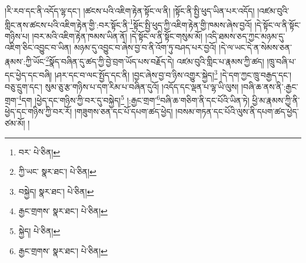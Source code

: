 །རི་རབ་དང་ནི་འདོད་ལྷ་དང་། །ཚངས་པའི་འཇིག་རྟེན་སྟོང་ལ་ནི། །སྟོང་ནི་སྤྱི་ཕུད་ཡིན་པར་འདོད། །འཛམ་བུའི་གླིང་ནས་ཚངས་པའི་འཇིག་རྟེན་གྱི་:བར་སྟོང་ནི་\footnote{བར་  པེ་ཅིན། }སྟོང་སྤྱི་ཕུད་ཀྱི་འཇིག་རྟེན་གྱི་ཁམས་ཞེས་བྱའོ། །དེ་སྟོང་ལ་ནི་སྟོང་གཉིས་པ། །བར་མའི་འཇིག་རྟེན་ཁམས་ཡིན་ནོ། །དེ་སྟོང་ལ་ནི་སྟོང་གསུམ་མོ། །འདི་ཐམས་ཅད་ཀྱང་མཉམ་དུ་འཇིག་ཅིང་འབྱུང་བ་ཡིན། མཉམ་དུ་འབྱུང་བ་ཞེས་བྱ་བ་ནི་འོག་ཏུ་བཤད་པར་བྱའོ། །དེ་ལ་ཡང་དེ་ན་སེམས་ཅན་རྣམས་:ཀྱི་ཡོང་\footnote{ཀྱི་ཡང་  སྣར་ཐང་།  པེ་ཅིན། }སྣོད་བཞིན་དུ་ཚད་ཀྱི་བྱེ་བྲག་ཡོད་པས་བརྗོད་དེ། འཛམ་བུའི་གླིང་པ་རྣམས་ཀྱི་ཚད། །ཁྲུ་བཞི་པ་དང་ཕྱེད་དང་བཞི། །ཤར་དང་བ་ལང་སྤྱོད་དང་ནི། །བྱང་ཞེས་བྱ་བ་ཉིས་འགྱུར་སྐྱེད།\footnote{བསྐྱེད།  སྣར་ཐང་།  པེ་ཅིན། } །དེ་དག་ཀྱང་ཁྲུ་བརྒྱད་དང་། བཅུ་དྲུག་དང་། སུམ་ཅུ་རྩ་གཉིས་པ་དག་རིམ་པ་བཞིན་དུའོ། །འདོད་དང་ལྡན་པ་ལྷ་ཡི་ལུས། །བཞི་ཆ་ནས་ནི་:རྒྱང་གྲག་\footnote{རྒྱང་གྲགས་  སྣར་ཐང་།  པེ་ཅིན། }དག །ཕྱེད་དང་གཉིས་ཀྱི་བར་དུ་བསྐྱེད།\footnote{སྐྱེད།  པེ་ཅིན། } །:རྒྱང་གྲག་\footnote{རྒྱང་གྲགས་  སྣར་ཐང་།  པེ་ཅིན། }བཞི་ཆ་གཅིག་ནི་དང་པོའི་ཡིན་ཏེ། ཕྱི་མ་རྣམས་ཀྱི་ནི་ཕྱེད་དང་གཉིས་ཀྱི་བར་རོ། །གཟུགས་ཅན་དང་པོ་དཔག་ཚད་ཕྱེད། །བསམ་གཏན་དང་པོའི་ལུས་ནི་དཔག་ཚད་ཕྱེད་ཙམ་མོ། །
